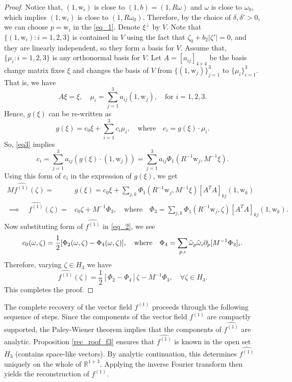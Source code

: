 \documentclass[11pt,a4paper,reqno]{amsart}
\newcommand{\w}{\mathrm{w}}
\begin{document}
\begin{proof}
		
		Notice that, $(1,\w_i)$ is close to $(1,b)=(1,R\omega)$ and $\omega$ is close to $\omega_0$, which implies $(1,\w_i)$ is close to $(1,R\omega_0)$. Therefore, by the choice of $\delta,\delta'>0$, we can choose $p=\w_i$ in the \eqref{eq_1}.
		Denote $\xi^{\perp}$ by $V$. Note that $\{(1,\w_{i}): i=1,2,3\}$ is contained in $V$ using the fact that $\zeta_0+ b_2 |\zeta'|=0$, and they are linearly independent, so they form a basis for $V$. 
		Assume that, $\{\mu_i:i=1,2,3\}$ is any orthonormal basis for $V$. 
		 Let $A=[a_{ij}]_{4\times 4}$ be the basis change matrix fixes $\xi$ and changes the basis of $V$ from $\{(1,\w_{j})\}_{j=1}^3$ to $\{\mu_{i}\}_{i=1}^3$. That is, we have
        \begin{equation}\label{basis_ch}
        A\xi = \xi, \quad \mu_i = \sum_{j=1}^{3}a_{ij}(1,\w_j), \quad \mbox{for }i=1,2,3.
        \end{equation}
         Hence, $g(\xi)$ can be re-written as 
		\begin{equation*}
			g(\xi)=c_{0}\xi +\sum_{i=1}^{3}c_{i}\mu_{i}, \quad \mbox{where}\quad c_i=g(\xi)\cdot \mu_{i}.
		\end{equation*}
		So, \eqref{eq3} implies
		\[
	c_i= \sum_{j=1}^3 a_{ij} (g(\xi)\cdot (1,\w_j))= \sum_{j=1}^{3} a_{ij}\Phi_{1}(R^{-1}\w_{j},M^{-1}\xi).
		\]
		Using this form of $c_i$ in the expression of $g(\xi)$, we get
		\[\begin{aligned}
			M\widehat{f^{(1)}}(\zeta)=&g(\xi)=c_0 \xi +\sum_{j,k}\Phi_{1}(R^{-1}\w_{j},M^{-1}\xi)[A^{T}A]_{kj}(1,\w_k)\\ 
			\implies \quad
			\widehat{f^{(1)}}(\zeta)=&c_0\zeta+M^{-1}\Phi_3,
			\quad\mbox{where}\quad \Phi_3=\sum_{j,k}\Phi_{1}(R^{-1}\w_{j},\zeta)[A^{T}A]_{kj}(1,\w_k).
		\end{aligned}\]
		Now substituting form of $\widehat{f^{(1)}}$ in \eqref{eq_2}, we see
		\[
		c_0(\omega,\zeta)=\frac{1}{2}[\Phi_2(\omega,\zeta)-\Phi_4(\omega,\zeta)],
		\quad \mbox{where} \quad \Phi_4=\sum_{p,i}\Tilde{\omega}_{p}\Tilde{\omega}_{i}\partial_{p}[M^{-1}\Phi_3]_i.
		\]
		Therefore, varying $\zeta \in H_3$ we have 
		\[
		\widehat{f^{(1)}}(\zeta)=\frac{1}{2}[\Phi_2-\Phi_4]\zeta - M^{-1}\Phi_3, \quad \forall \zeta \in H_3.
		\]
		This completes the proof.
	\end{proof}
	The complete recovery of the vector field \( f^{(1)} \) proceeds through the following sequence of steps. Since the components of the vector field $f^{(1)}$ are compactly supported, the Paley-Wiener theorem implies that the components of \( \widehat{f^{(1)}} \) are analytic. Proposition \ref{rec_roof_f3} ensures that \( \widehat{f^{(1)}} \) is known in the open set \( H_3 \) (contains space-like vectors). By analytic continuation, this determines \( \widehat{f^{(1)}} \) uniquely on the whole of \( \mathbb{R}^{1+3} \). Applying the inverse Fourier transform then yields the reconstruction of \( f^{(1)} \).
\end{document}
